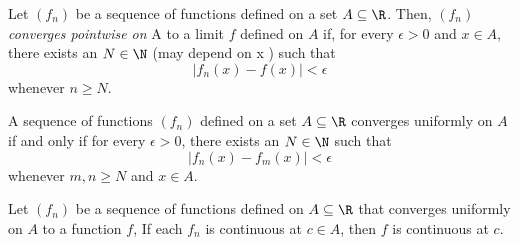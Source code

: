 \begin{tcolorbox}
    \begin{defn}
    Let \( (f_n)  \) be a sequence of functions defined on a set \( A \subseteq \R  \). Then, \( (f_n)  \) \textit{converges pointwise on} A to a limit \( f  \) defined on \( A  \) if, for every \( \epsilon > 0   \) and \( x \in A  \), there exists an \( N \in \N  \) (may depend on x ) such that 
    \[  | f_n(x) - f(x)  | < \epsilon  \] whenever \( n \geq N  \).
    \end{defn}
\end{tcolorbox}


\begin{tcolorbox}
    \begin{thm}
    A sequence of functions \( (f_n)  \) defined on a set \( A \subseteq \R  \) converges uniformly on \( A  \) if and only if for every \( \epsilon > 0  \), there exists an \( N \in \N  \) such that 
    \[  | f_n(x) - f_m(x)  | < \epsilon  \]
    whenever \( m,n \geq N  \) and \( x \in A  \).
    \end{thm}
\end{tcolorbox}


\begin{tcolorbox}
    \begin{thm}
    Let \( (f_n)  \) be a sequence of functions defined on \( A \subseteq \R  \) that converges uniformly on \( A  \) to a function \( f  \), If each \( f_n   \) is continuous at \( c \in A  \), then \( f  \) is continuous at \( c  \).
    \end{thm}
\end{tcolorbox}



